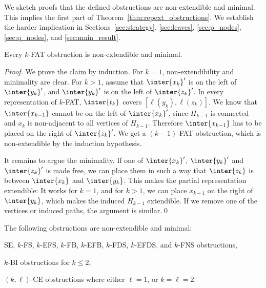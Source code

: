 We sketch proofs that the defined obstructions are non-extendible and minimal. This implies the
first part of Theorem~\ref{thm:repext_obstructions}.  We establish the harder implication in
Sections~\ref{sec:strategy}, \ref{sec:leaves}, \ref{sec:p_nodes}, \ref{sec:q_nodes}, and
\ref{sec:main_result}. 

\begin{lemma} \label{lem:correctness_k_FAT}
Every $k$-FAT obstruction is non-extendible and minimal.
\end{lemma}

\begin{proof}
We prove the claim by induction. For $k=1$, non-extendibility and minimality are clear. For
$k>1$, assume that $\inter{x_k}'$ is on the left of $\inter{y_k}'$, and $\inter{y_k}'$ is on the left of $\inter{z_k}'$. In every representation of
$k$-FAT, $\inter{t_k}$ covers $[\ell(y_k),\ell(z_k)]$.  We know that
$\inter{x_{k-1}}$ cannot be on the left of $\inter{x_k}'$, since $H_{k-1}$ is connected and $x_k$ is
non-adjacent to all vertices of $H_{k-1}$.  Therefore $\inter{x_{k-1}}$ has to be placed on the
right of $\inter{z_k}'$. We get a $(k-1)$-FAT obstruction, which is non-extendible by
the induction hypothesis.

It remains to argue the minimality. If one of $\inter{x_k}'$, $\inter{y_k}'$ and $\inter{z_k}'$ is
made free, we can place them in such a way that $\inter{z_k}$ is between $\inter{x_k}$ and
$\inter{y_k}$. This makes the partial representation extendible: It works for $k=1$, and for $k>1$,
we can place $x_{k-1}$ on the right of $\inter{y_k}$, which makes the induced $H_{k-1}$ extendible.
If we remove one of the vertices or induced paths, the argument is similar.\qed
\end{proof}

\begin{lemma} \label{lem:correctness_all}
The following obstructions are non-extendible and minimal:
\begin{packed_itemize}
\item SE, $k$-FS, $k$-EFS, $k$-FB, $k$-EFB, $k$-FDS, $k$-EFDS, and $k$-FNS obstructions,
\item $k$-BI obstructions for $k \le 2$,
\item $(k,\ell)$-CE obstructions where either $\ell = 1$, or $k=\ell=2$.
\end{packed_itemize}
\end{lemma}

